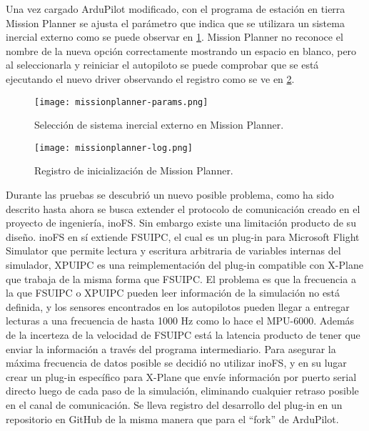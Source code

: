 Una vez cargado ArduPilot modificado, con el programa de estación en tierra Mission Planner se ajusta el parámetro que indica que se utilizara un sistema inercial externo como se puede observar en \cref{fig:missionplanner-params}. Mission Planner no reconoce el nombre de la nueva opción correctamente mostrando un espacio en blanco, pero al seleccionarla y reiniciar el autopiloto se puede comprobar que se está ejecutando el nuevo driver observando el registro como se ve en \cref{fig:missionplanner-log}.

\begin{figure}[h]
    \centering
    \texttt{[image: missionplanner-params.png]}
    \caption{Selección de sistema inercial externo en Mission Planner.}
    \label{fig:missionplanner-params}
\end{figure}

\begin{figure}[h]
    \centering
    \texttt{[image: missionplanner-log.png]}
    \caption{Registro de inicialización de Mission Planner.}
    \label{fig:missionplanner-log}
\end{figure}

Durante las pruebas se descubrió un nuevo posible problema, como ha sido descrito hasta ahora se busca extender el protocolo de comunicación creado en el proyecto de ingeniería, inoFS. Sin embargo existe una limitación producto de su diseño. inoFS en sí extiende FSUIPC, el cual es un plug-in para Microsoft Flight Simulator que permite lectura y escritura arbitraria de variables internas del simulador, XPUIPC es una reimplementación del plug-in compatible con X-Plane que trabaja de la misma forma que FSUIPC. El problema es que la frecuencia a la que FSUIPC o XPUIPC pueden leer información de la simulación no está definida, y los sensores encontrados en los autopilotos pueden llegar a entregar lecturas a una frecuencia de hasta 1000 Hz como lo hace el MPU-6000. Además de la incerteza de la velocidad de FSUIPC está la latencia producto de tener que enviar la información a través del programa intermediario. Para asegurar la máxima frecuencia de datos posible se decidió no utilizar inoFS, y en su lugar crear un plug-in específico para X-Plane que envíe información por puerto serial directo luego de cada paso de la simulación, eliminando cualquier retraso posible en el canal de comunicación. Se lleva registro del desarrollo del plug-in en un repositorio en GitHub \cite{xplane-hitl-plugin} de la misma manera que para el ``fork'' de ArduPilot.

